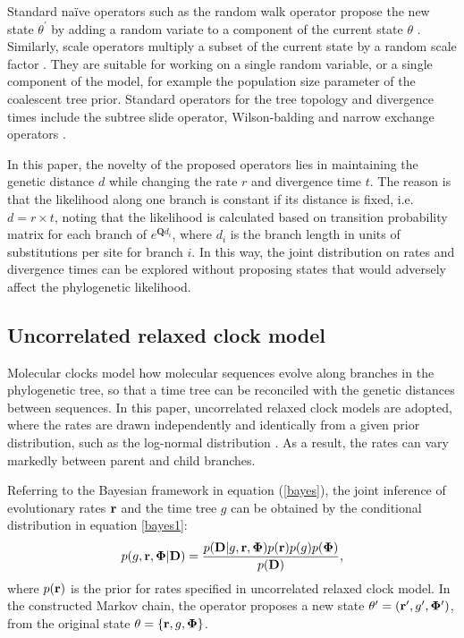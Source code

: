 \documentclass{bmcart}
\begin{document}
Standard na\"{i}ve operators such as the random walk operator propose the new state $\theta^\prime$ by adding a random variate to a component of the current state $\theta$ \cite{suchard2005stochastic}. Similarly, scale operators multiply a subset of the current state by a random scale factor \cite{higuchi1997monte}. They are suitable for working on a single random variable, or a single component of the model, for example the population size parameter of the coalescent tree prior. Standard operators for the tree topology and divergence times include the subtree slide operator, Wilson-balding and narrow exchange operators \cite{drummond2002estimatingdata,hohna2008clock}.

In this paper, the novelty of the proposed operators lies in maintaining the genetic distance $d$ while changing the rate $r$ and divergence time $t$. The reason is that the likelihood along one branch is constant if its distance is fixed, i.e. $d = r \times t$, noting that the likelihood is calculated based on transition probability matrix for each branch of ${e^{\textbf{Q}d_i}}$, where $d_i$ is the branch length in units of substitutions per site for branch $i$. In this way, the joint distribution on rates and divergence times can be explored without proposing states that would adversely affect the phylogenetic likelihood.

\subsection*{Uncorrelated relaxed clock model}
Molecular clocks model how molecular sequences evolve along branches in the phylogenetic tree, so that a time tree can be reconciled with the genetic distances between sequences. In this paper, uncorrelated relaxed clock models are adopted, where the rates are drawn independently and identically from a given prior distribution, such as the log-normal distribution \cite{drummond2006relaxed}. As a result, the rates can vary markedly between parent and child branches.

Referring to the Bayesian framework in equation (\ref{bayes}), the joint inference of evolutionary rates ${\bf{r}}$ and the time tree $g$ can be obtained by the conditional distribution in equation \ref{bayes1}:
\begin{equation}\label{bayes1}
p(g,{\bf{r}},{\bf{\Phi}} |{\bf{D}}) = \frac{{p({\bf{D}}|g,{\bf{r}},{\bf{\Phi}} )p({\bf{r}})p(g)p({\bf{\Phi}} )}}{{p({\bf{D}})}} \text{,}
\end{equation}
where $p({\bf{r}})$ is the prior for rates specified in uncorrelated relaxed clock model. In the constructed Markov chain, the operator proposes a new state ${\theta^\prime} = ({\bf{r}^\prime},g^\prime,{\bf{\Phi}^\prime})$, from the original state $\theta =  \{ {\bf{r}},g,{\bf{\Phi}}\}$.
\end{document}
